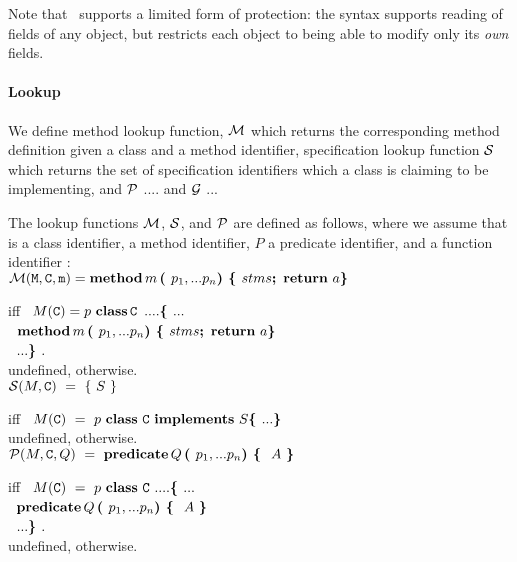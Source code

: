 Note that \LangOO\, supports a limited form of protection: the syntax
  supports  reading of fields of any object, but restricts each object
  to being able to modify only its \emph{own} fields.






\paragraph{Lookup} We define  method lookup function, $\cal M$ which returns the corresponding method definition given a class and a method identifier, specification lookup function $\cal S$ which returns the set of specification identifiers which a class is claiming to be implementing, and  $\cal P$ .... and $\cal G$  ...
\begin{definition}[Lookup] The lookup functions $\cal M$, $\cal S$, and $\cal P$ are defined as follows, where we assume that  is a class identifier,    a method identifier,
$P$ a predicate identifier, and  a function identifier : $ ~ $ \\

\noindent
$
{\cal M}({{\textrm{\ttfamily{M}}}{{{\textrm{\ttfamily{}}}}}},{\textrm{\ttfamily{{\ensuremath{\textrm{\ttfamily{C}}}}}}}, {\textrm{\ttfamily{m}}})      =       {\bf {method}}\, m\, {\mbox{\tt{\bf{( }}}} p_1, ... p_n \mbox{\tt{\bf{) }}}
\mbox{\tt{\bf{\{ }}} stms \mbox{{{\bf {;}}}\ }\, {\bf {return}}\ {{a}} {\mbox{\tt{\bf{\} }}}}
 $

\noindent
 iff \ $ M({\textrm{\ttfamily{C}}}) =  p\ {\bf {class}}\, {\textrm{\ttfamily{C}}}\, \ .... \mbox{\tt{\bf{\{ }}} ...  $\\
$ ~ $  \hspace{.8in} $ {\bf {method}}\, m\, {\mbox{\tt{\bf{( }}}} p_1, ... p_n \mbox{\tt{\bf{) }}}
\mbox{\tt{\bf{\{ }}} stms \mbox{{{\bf {;}}}\ }\, {\bf {return}}\ {{a}} {\mbox{\tt{\bf{\} }}}}$\\
$ ~ $ \hspace{.7in} $ ... {\mbox{\tt{\bf{\} }}}}.$
\\
\noindent
undefined, otherwise. $ ~ $ \\


\noindent
 $
   {\cal S} ({\M}, {\prg{C}})\      = \     \{ \ \syntax{S} \ \}
 $

\noindent
 iff \ $ \M(\prg{C}) \ =\   p\ \kw{class}\  \prg{C} \ \kw{implements}\ \syntax{S}  \lb   ...  \rb $\\
\noindent
undefined, otherwise. $ ~ $ \\


\noindent
 $
   {\cal P} ({M}, {{\textrm{\ttfamily{C}}}}, {Q})\      =  \     {\bf {predicate}}\, Q\, {\mbox{\tt{\bf{( }}}} p_1, ... p_n \mbox{\tt{\bf{) }}}
\mbox{\tt{\bf{\{ }}}\ A \ {\mbox{\tt{\bf{\} }}}}
 $

\noindent
 iff \ $ \M(\prg{C})\ =\ p\  \kw{class}\  \prg{C} \ .... \lb ...  $\\
$ ~ $  \hspace{.8in} $ {\bf {predicate}}\, Q\, {\mbox{\tt{\bf{( }}}} p_1, ... p_n \mbox{\tt{\bf{) }}}
\mbox{\tt{\bf{\{ }}}\ A \ {\mbox{\tt{\bf{\} }}}} $\\
$ ~ $ \hspace{.7in} $ ... {\mbox{\tt{\bf{\} }}}}.$
\\
\noindent
undefined, otherwise.$ ~ $ \\



\end{definition}
